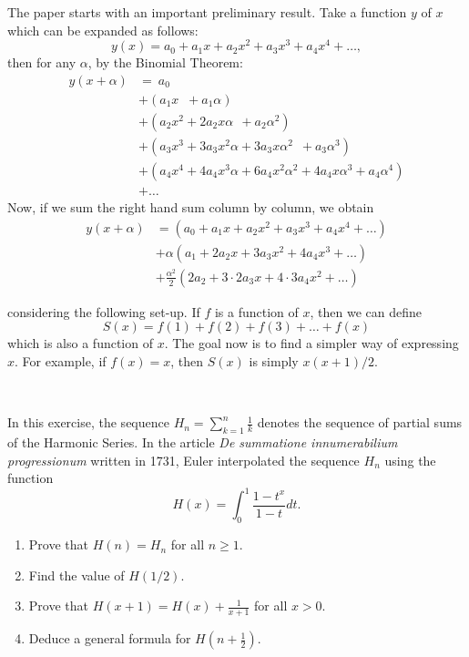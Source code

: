 The paper starts with an important preliminary result. Take a function $y$ of $x$ which can be expanded as follows:
$$y(x) = a_0 + a_1x + a_2x^2 + a_3x^3 + a_4x^4 + \dots,$$
then for any $\alpha$, by the Binomial Theorem:
\begin{align*}
    y(x+\alpha) &= \ a_0 \\
    &+ \left(a_1 x \ \, \, \! + a_1 \alpha\right) \\
    &+ \left(a_2 x^2 + 2a_2 x \alpha \ \ \!+ a_2 \alpha^2\right) \\
    &+ \left(a_3 x^3 + 3a_3 x^2 \alpha + 3 a_3 x\alpha^2 \, \, \,  + a_3 \alpha^3\right) \\
    &+ \left(a_4 x^4 + 4a_4 x^3 \alpha + 6 a_4 x^2 \alpha^2 + 4 a_4 x \alpha^3 + a_4 \alpha^4 \right) \\
    &+ \dots
\end{align*}
Now, if we sum the right hand sum column by column, we obtain
\begin{align*}
    y(x+\alpha) &= (a_0 + a_1 x + a_2 x^2 + a_3 x^3 + a_4 x^4 + \dots) \\
    &+ \alpha(a_1 + 2a_2x + 3a_3 x^2 + 4 a_4 x^3 + \dots) \\
    &+ \frac{\alpha^2}{2}(2a_2 + 3\cdot 2 a_3x + 4\cdot 3 a_4 x^2 + \dots)
\end{align*}

considering the following set-up. If $f$ is a function of $x$, then we can define
\begin{equation}
    S(x) = f(1) + f(2) + f(3) + \dots + f(x)
\end{equation}
which is also a function of $x$. The goal now is to find a simpler way of expressing $x$. For example, if $f(x) = x$, then $S(x)$ is simply $x(x+1)/2$. 

\td \\


\begin{exercise}
    In this exercise, the sequence $H_n = \sum_{k=1}^{n}\frac{1}{k}$ denotes the sequence of partial sums of the Harmonic Series. In the article \textit{De summatione innumerabilium progressionum} written in 1731, Euler interpolated the sequence $H_n$ using the function
    $$H(x) = \int_{0}^{1}\frac{1-t^x}{1-t}dt.$$
    \begin{enumerate}[label=(\alph*)]
        \item Prove that $H(n) = H_n$ for all $n \geq 1$.
        \item Find the value of $H(1/2)$.
        \item Prove that $H(x + 1) = H(x) + \frac{1}{x+1}$ for all $x > 0$.
        \item Deduce a general formula for $H(n + \frac{1}{2})$. 
    \end{enumerate}
\end{exercise}

